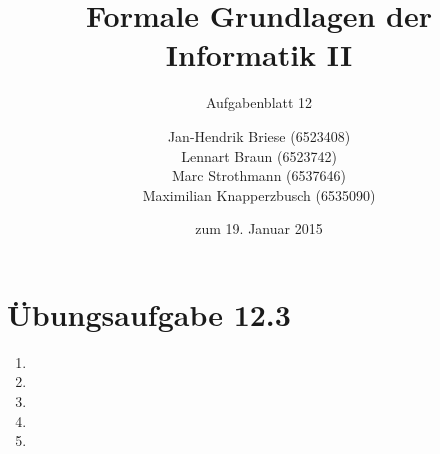 \documentclass[a4paper]{scrartcl}
\title{Formale Grundlagen der Informatik II}
\subtitle{Aufgabenblatt 12}
\author{
    Jan-Hendrik Briese (6523408) \\
    Lennart Braun (6523742) \\
    Marc Strothmann (6537646) \\
    Maximilian Knapperzbusch (6535090)
}
\date{zum 19. Januar 2015}
\begin{document}
\maketitle

\section*{Übungsaufgabe 12.3} 
\begin{enumerate}
    \item

    \item

    \item

    \item

    \item

\end{enumerate}
\end{document}
